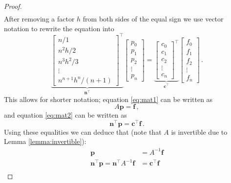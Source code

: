 \documentclass{article}
\begin{document}
\begin{proof}
\begin{align}
\end{align}
After removing a factor $h$ from both sides of the equal sign we use vector notation to rewrite the equation into
\begin{equation}
    \underbrace{\begin{bmatrix}
        n/1\\
        n^2h/2\\
        n^3h^2/3\\
        \vdots \\
        n^{n+1}h^n/(n+1)
    \end{bmatrix}^\top}_{\mathbf n^\top}
    \begin{bmatrix}
        p_0\\
        p_1\\
        p_2\\
        \vdots \\
        p_n
    \end{bmatrix}
    =
    \underbrace{\begin{bmatrix}
        c_0 \\
        c_1 \\
        c_2 \\
        \vdots \\
        c_n
    \end{bmatrix}^\top}_{\mathbf c^\top}
    \begin{bmatrix}
        f_0 \\
        f_1 \\
        f_2 \\
        \vdots \\
        f_n
    \end{bmatrix} \,. \label{eq:mat2}
\end{equation}
This allows for shorter notation; equation \ref{eq:mat1} can be written as
\begin{equation}
    A \mathbf p = \mathbf f \,, \nonumber
\end{equation}
and equation \ref{eq:mat2} can be written as
\begin{equation}
    \mathbf n ^\top \mathbf p = \mathbf c^\top \mathbf f \,. \nonumber
\end{equation}
Using these equalities we can deduce that (note that $A$ is invertible due to Lemma \ref{lemma:invertible}):
\begin{align}
    \mathbf p &= A^{-1} \mathbf f \nonumber \\
    \mathbf n^\top \mathbf p = \mathbf n^\top A^{-1} \mathbf f &= \mathbf c^\top \mathbf f \nonumber \\

\end{align}
\end{proof}
\end{document}
